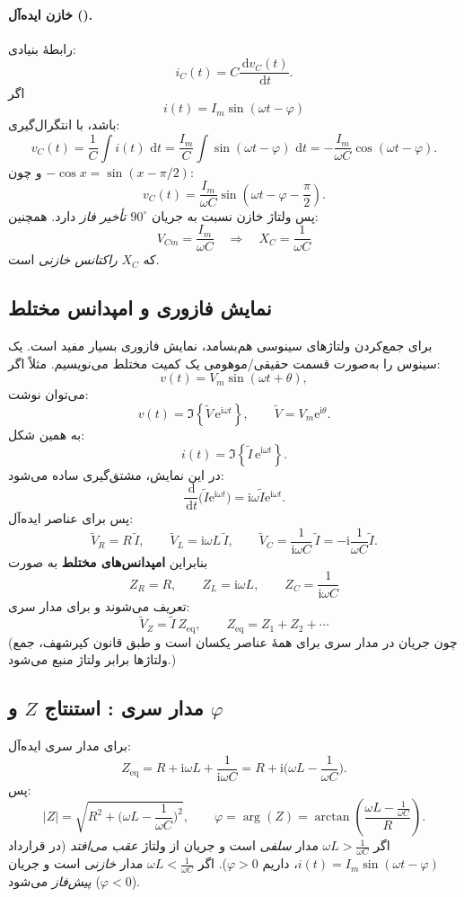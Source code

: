 \documentclass[a4paper,11pt]{article}
\newcommand{\ii}{\mathrm{i}} %
\newcommand{\dd}{\,\mathrm{d}}
\newcommand{\e}{\mathrm{e}}
\newcommand{\abs}[1]{\left|#1\right|}
\begin{document}
\paragraph{خازن ایده‌آل ().}
رابطهٔ بنیادی:
\[
i_C(t)=C\frac{\dd v_C(t)}{\dd t}.
\]
اگر
\[
i(t)=I_m\sin(\omega t-\varphi)
\]
باشد، با انتگرال‌گیری:
\[
v_C(t)=\frac{1}{C}\int i(t)\,\dd t
=\frac{I_m}{C}\int \sin(\omega t-\varphi)\,\dd t
=-\frac{I_m}{\omega C}\cos(\omega t-\varphi).
\]
و چون $-\cos x=\sin(x-\pi/2)$:
\[
v_C(t)=\frac{I_m}{\omega C}\sin\!\left(\omega t-\varphi-\frac{\pi}{2}\right).
\]
پس ولتاژ خازن نسبت به جریان \emph{$90^\circ$ تأخیر فاز} دارد. همچنین:
\[
V_{Cm}=\frac{I_m}{\omega C}\quad\Rightarrow\quad X_C=\frac{1}{\omega C}
\]
که $X_C$ \emph{راکتانس خازنی} است.

\subsection{نمایش فازوری و امپدانس مختلط}
برای جمع‌کردن ولتاژهای سینوسی هم‌بسامد، نمایش فازوری بسیار مفید است. یک سینوس را به‌صورت قسمت حقیقی/موهومی یک کمیت مختلط می‌نویسیم. مثلاً اگر:
\[
v(t)=V_m\sin(\omega t+\theta),
\]
می‌توان نوشت:
\[
v(t)=\Im\!\left\{ \tilde V\,\e^{\ii \omega t} \right\},\qquad \tilde V=V_m\e^{\ii\theta}.
\]
به همین شکل:
\[
i(t)=\Im\!\left\{ \tilde I\,\e^{\ii \omega t} \right\}.
\]
در این نمایش، مشتق‌گیری ساده می‌شود:
\[
\frac{\dd}{\dd t}\Big(\tilde I \e^{\ii\omega t}\Big)=\ii\omega \tilde I \e^{\ii\omega t}.
\]
پس برای عناصر ایده‌آل:
\[
\tilde V_R=R\,\tilde I,\qquad
\tilde V_L=\ii\omega L\,\tilde I,\qquad
\tilde V_C=\frac{1}{\ii\omega C}\,\tilde I=-\ii\frac{1}{\omega C}\tilde I.
\]
بنابراین \textbf{امپدانس‌های مختلط} به صورت
\[
Z_R=R,\qquad Z_L=\ii\omega L,\qquad Z_C=\frac{1}{\ii\omega C}
\]
تعریف می‌شوند و برای مدار سری:
\[
\tilde V_Z=\tilde I\,Z_{\text{eq}},\qquad Z_{\text{eq}}=Z_1+Z_2+\cdots
\]
(چون جریان در مدار سری برای همهٔ عناصر یکسان است و طبق قانون کیرشهف، جمع ولتاژها برابر ولتاژ منبع می‌شود.)

\subsection{مدار سری : استنتاج $Z$ و $\varphi$}
برای مدار سری  ایده‌آل:
\[
Z_{\text{eq}} = R + \ii\omega L + \frac{1}{\ii\omega C}
= R + \ii\Big(\omega L-\frac{1}{\omega C}\Big).
\]
پس:
\[
\abs{Z}=\sqrt{R^2+\Big(\omega L-\frac{1}{\omega C}\Big)^2},
\qquad
\varphi=\arg(Z)=\arctan\!\left(\frac{\omega L-\frac{1}{\omega C}}{R}\right).
\]
اگر $\omega L>\frac{1}{\omega C}$ مدار \emph{سلفی} است و جریان از ولتاژ \emph{عقب می‌افتد} (در قرارداد $i(t)=I_m\sin(\omega t-\varphi)$، داریم $\varphi>0$).
اگر $\omega L<\frac{1}{\omega C}$ مدار \emph{خازنی} است و جریان \emph{پیش‌فاز} می‌شود ($\varphi<0$).
\end{document}
